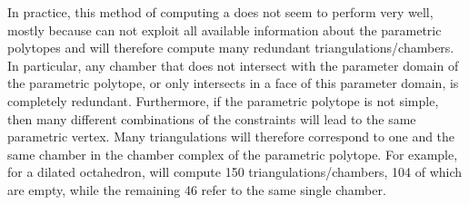 In practice, this method of computing a 
does not seem to perform very well, mostly because
 can not exploit all available information
about the parametric polytopes and will therefore compute
many redundant triangulations/chambers.
In particular, any chamber that does not intersect with
the parameter domain of the parametric polytope, or only
intersects in a face of this parameter domain, is completely redundant.
Furthermore, if the parametric polytope is not simple, then many
different combinations of the constraints will lead to the same parametric
vertex.  Many triangulations will therefore correspond to one and the
same chamber in the chamber complex of the parametric polytope.
For example, for a dilated octahedron,  will
compute 150 triangulations/chambers, 104 of which are empty,
while the remaining 46 refer to the same single chamber.
